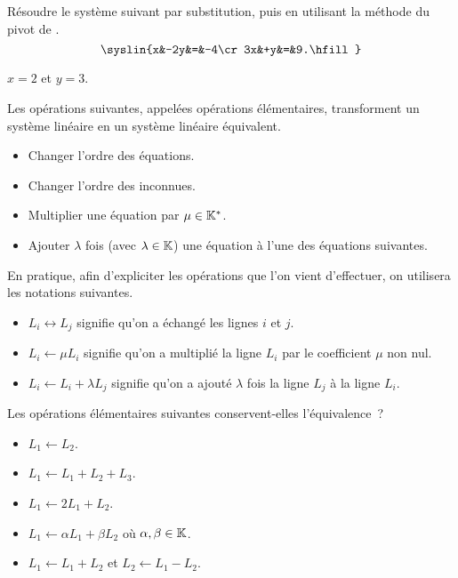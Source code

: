 \documentclass{magnolia}
\begin{document}
\begin{exoUnique}
\exo Résoudre le système suivant par substitution, puis en utilisant la méthode du pivot
de .
  \[\syslin{x&-2y&=&-4\cr
            3x&+y&=&9.\hfill}\]
  \begin{sol}
  $x=2$ et $y=3$.            
  \end{sol}
\end{exoUnique}

\begin{proposition}[utile=-3]
Les opérations suivantes, appelées opérations élémentaires, transforment un
système linéaire en un système linéaire équivalent.
\begin{itemize}
\item Changer l'ordre des équations.
\item Changer l'ordre des inconnues.
\item Multiplier une équation par $\mu\in\mathbb{K}^*$.
\item Ajouter $\lambda$ fois (avec $\lambda\in\mathbb{K}$) une équation à l'une des
  équations suivantes.
\end{itemize}
\end{proposition}

\begin{remarqueUnique}
\remarque En pratique, afin d'expliciter les opérations que l'on vient d'effectuer, on
  utilisera les notations suivantes.
\begin{itemize}
\item $L_i\leftrightarrow L_j$ signifie qu'on a échangé les lignes $i$ et $j$.
\item $L_i\gets \mu L_i$ signifie qu'on a multiplié la ligne $L_i$ par le coefficient $\mu$ non nul.
\item $L_i\gets L_i + \lambda L_j$ signifie qu'on a ajouté $\lambda$ fois la ligne $L_j$ à la ligne $L_i$.
\end{itemize}
\end{remarqueUnique}

\begin{exoUnique}
\exo Les opérations élémentaires suivantes conservent-elles l'équivalence~?
  \begin{itemize}
  \item $L_1 \gets L_2$.
  \item $L_1 \gets L_1+L_2+L_3$.
  \item $L_1 \gets 2 L_1 + L_2$.
  \item $L_1 \gets \alpha L_1 + \beta L_2$ où $\alpha,\beta\in\mathbb{K}$.
  \item $L_1 \gets L_1+L_2$ et $L_2 \gets L_1-L_2$.
  \end{itemize}
\end{exoUnique}
\end{document}
